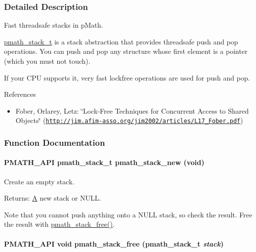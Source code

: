 \subsubsection{Detailed Description}
Fast threadsafe stacks in pMath. 

\hyperlink{classpmath__stack__t}{pmath\_\-stack\_\-t} is a stack abstraction that provides threadsafe push and pop operations. You can push and pop any structure whose first element is a pointer (which you must not touch).

If your CPU supports it, very fast lockfree operations are used for push and pop.

References\begin{itemize}
\item Fober, Orlarey, Letz: \char`\"{}Lock-Free Techniques for Concurrent Access to Shared Objects\char`\"{} (\href{http://jim.afim-asso.org/jim2002/articles/L17_Fober.pdf}{\tt http://jim.afim-asso.org/jim2002/articles/L17\_\-Fober.pdf}) \end{itemize}


\subsubsection{Function Documentation}
\hypertarget{group__stacks_g4a549111f394261de5ac3cc3acda428b}{
\paragraph[{pmath\_\-stack\_\-new}]{\setlength{\rightskip}{0pt plus 5cm}PMATH\_\-API {\bf pmath\_\-stack\_\-t} pmath\_\-stack\_\-new (void)}\hfill}
\label{group__stacks_g4a549111f394261de5ac3cc3acda428b}


Create an empty stack. 

\begin{Desc}
\item[Returns:]\hyperlink{class_a}{A} new stack or NULL.\end{Desc}
Note that you cannot push anything onto a NULL stack, so check the result. Free the result with \hyperlink{group__stacks_gc681555957545245455f2a0ac97e3828}{pmath\_\-stack\_\-free()}. \hypertarget{group__stacks_gc681555957545245455f2a0ac97e3828}{
\paragraph[{pmath\_\-stack\_\-free}]{\setlength{\rightskip}{0pt plus 5cm}PMATH\_\-API void pmath\_\-stack\_\-free ({\bf pmath\_\-stack\_\-t} {\em stack})}\hfill}
\label{group__stacks_gc681555957545245455f2a0ac97e3828}


